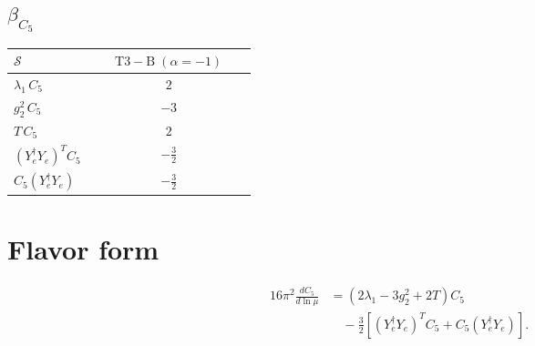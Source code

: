 \documentclass[9pt]{article}
\begin{document}
\subsection*{$ \beta_{C_5} $}
\begin{longtable}{@{}p{0.31\linewidth}c@{}}
\toprule
$\mathcal{S}$ & $ \mathrm{T3-B}\;(\alpha=-1) $ \\
\midrule
$ \lambda_1\,C_5 $ & $ 2 $ \\
$ g_2^2\,C_5 $ & $ -3 $ \\
$ T\,C_5 $ & $ 2 $ \\
$ (Y_e^\dagger Y_e)^T C_5 $ & $ - \frac{3}{2} $ \\
$ C_5(Y_e^\dagger Y_e) $ & $ - \frac{3}{2} $ \\
\bottomrule
\end{longtable}
\section*{Flavor form}
\begin{align}
16\pi^2\frac{dC_5}{d\ln\mu}&=(2\lambda_1-3g_2^2+2T)C_5\\
&\quad-\frac32\left[(Y_e^\dagger Y_e)^T C_5+C_5(Y_e^\dagger Y_e)\right].
\end{align}
\end{document}
